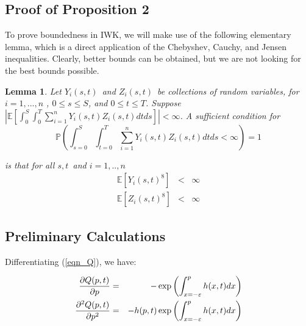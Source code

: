 \documentclass{article}
\newtheorem{lemma}[theorem]{Lemma}
\begin{document}
\appendix

\subsection{Proof of Proposition 2}

To prove boundedness in IWK, we will make use of the following elementary
lemma, which is a direct application of the Chebyshev, Cauchy, and Jensen
inequalities. Clearly, better bounds can be obtained, but we are not looking
for the best bounds possible.


\begin{lemma}
\label{lemma::finite_eighth_moment} \textit{Let }$Y_{i}(s,t)$\textit{\ and }$%
Z_{i}(s,t)$\textit{\ be collections of random variables, for }$i=1,...,n$%
\textit{, }$0\leq s\leq S$\textit{, and }$0\leq t\leq T$\textit{. Suppose }$|%
\mathbb{E}[\int_{0}^{S}\int_{0}^{T}\sum_{i=1}^{n}Y_{i}(s,t)Z_{i}(s,t)dtds]|<%
\infty $\textit{. A sufficient condition for }%
\begin{equation*}
\mathbb{P}\left(\int_{s=0}^{S}\int_{t=0}^{T}%
\sum_{i=1}^{n}Y_{i}(s,t)Z_{i}(s,t)dtds<\infty \right)=1
\end{equation*}

\textit{is that for all }$s,t$\textit{\ and }$i=1,..,n$%
\begin{eqnarray*}
\mathbb{E}[Y_{i}(s,t)^{8}] &<&\infty  \\
\mathbb{E}[Z_{i}(s,t)^{8}] &<&\infty
\end{eqnarray*}
\end{lemma}

\subsection{Preliminary Calculations}

Differentiating (\ref{eqn_Q}), we have:

\begin{eqnarray}
\frac{\partial Q(p,t)}{\partial p} &=&-\exp \left( {\int_{x=-\varepsilon
}^{p}h(x,t)dx}\right)  \label{dQdp_3} \\
\frac{\partial ^{2}Q(p,t)}{\partial p^{2}} &=&-{h(p,t)}\exp \left( {%
\int_{x=-\varepsilon }^{p}h(x,t)dx}\right)  \label{dQdp_2_3}
\end{eqnarray}
\end{document}
